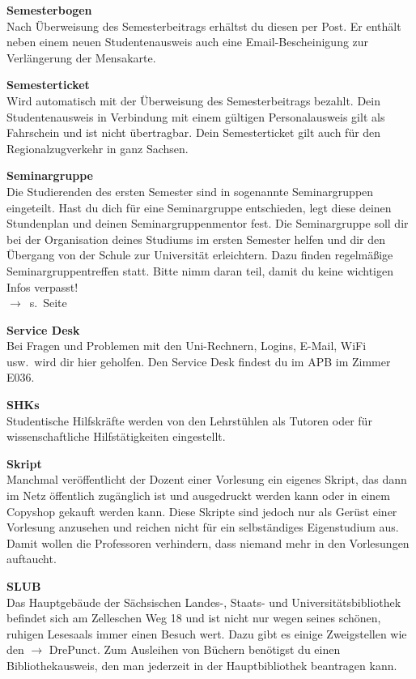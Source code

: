 \begin{multicols}{2}
\textbf{Semesterbogen} \\
Nach Überweisung des Semesterbeitrags erhältst du diesen per Post.
Er enthält neben einem neuen Studentenausweis auch eine Email-Bescheinigung zur Verlängerung der Mensakarte.

\textbf{Semesterticket} \\
Wird automatisch mit der Überweisung des Semesterbeitrags bezahlt.
Dein Studentenausweis in Verbindung mit einem gültigen Personalausweis gilt als Fahrschein und ist nicht übertragbar.
Dein Semesterticket gilt auch für den Regionalzugverkehr in ganz Sachsen.

\textbf{Seminargruppe} \\
Die Studierenden des ersten Semester sind in sogenannte Seminargruppen eingeteilt. Hast du dich für eine Seminargruppe entschieden, legt diese deinen Stundenplan und deinen Seminargruppenmentor fest. Die Se\-mi\-nar\-grup\-pe soll dir bei der Organisation deines Studiums im ersten Semester helfen und dir den Übergang von der Schule zur Universität erleichtern. Dazu finden regelmäßige Seminargruppentreffen statt. Bitte nimm daran teil, damit du keine wichtigen Infos verpasst! \\
$\rightarrow$~s.~Seite~\pageref{sec:seminargruppen}

\textbf{Service Desk} \\
Bei Fragen und Problemen mit den Uni-Rechnern, Logins, E-Mail, WiFi usw.\ wird dir hier geholfen. Den Service Desk findest du im APB im Zimmer E036.


\textbf{SHKs} \\
Studentische Hilfskräfte werden von den Lehrstühlen als Tutoren oder für wissenschaftliche Hilfstätigkeiten eingestellt.

\textbf{Skript} \\
Manchmal veröffentlicht der Dozent einer Vorlesung ein eigenes Skript, das dann im Netz öffentlich zugänglich ist und ausgedruckt werden kann oder in einem Copyshop gekauft werden kann.
Diese Skripte sind jedoch nur als Gerüst einer Vorlesung anzusehen und reichen nicht für ein selbständiges Eigenstudium aus.
Damit wollen die Professoren verhindern, dass niemand mehr in den Vorlesungen auftaucht.

\textbf{SLUB} \\
Das Hauptgebäude der Sächsischen Landes-, Staats- und Universitätsbibliothek~ befindet sich am Zelleschen Weg 18 und ist nicht nur wegen seines schönen, ruhigen Lesesaals immer einen Besuch wert.
Dazu gibt es einige Zweigstellen wie den $\rightarrow$ DrePunct.
Zum Ausleihen von Büchern benötigst du einen Bibliothekausweis, den man jederzeit in der Hauptbibliothek beantragen kann.


\end{multicols}
